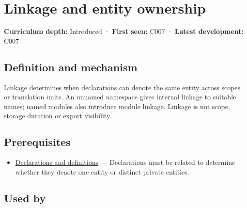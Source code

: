 \hypertarget{appendix-74a0ec818c18}{}\label{referencestart:appendix-74a0ec818c18}
\section{Linkage and entity ownership}\label{appendix-74a0ec818c18-linkage-and-entity-ownership}

\hypertarget{appendix-74a0ec818c18-linkage-and-entity-ownership}{}

\textbf{Curriculum depth:} Introduced · \textbf{First seen:} C007 · \textbf{Latest development:} C007

\begin{allmightroledefinition}

\subsection{Definition and mechanism}\label{appendix-74a0ec818c18-definition-and-mechanism}

\hypertarget{appendix-74a0ec818c18-definition-and-mechanism}{}

Linkage determines when declarations can denote the same entity across scopes or translation units. An unnamed namespace gives internal linkage to suitable names; named modules also introduce module linkage. Linkage is not scope, storage duration or export visibility.

\end{allmightroledefinition}

\subsection{Prerequisites}\label{appendix-74a0ec818c18-prerequisites}

\hypertarget{appendix-74a0ec818c18-prerequisites}{}

\begin{itemize}
\tightlist
\item
  \hyperref[appendix-2e4d494c2d94]{Declarations and definitions} --- Declarations must be related to determine whether they denote one entity or distinct private entities.
\end{itemize}

\subsection{Used by}\label{appendix-74a0ec818c18-used-by}

\hypertarget{appendix-74a0ec818c18-used-by}{}

